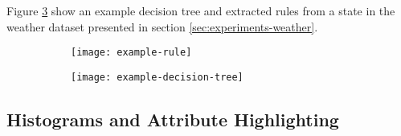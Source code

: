 Figure \ref{fig:example-decision-tree-and-rule} show an example decision tree and extracted rules
from a state in the weather dataset presented in section \ref{sec:experiments-weather}.

\begin{figure}[h!]
	\centering
	\begin{subfigure}{.3\columnwidth}
	  	\centering
	  	\texttt{[image: example-rule]}
  		\caption{}
  		\label{fig:example-rule}
	\end{subfigure}
	\begin{subfigure}{.68\columnwidth}
	  	\centering
	  	\texttt{[image: example-decision-tree]}
	  	\caption{}
	  	\label{fig:example-decision-tree}
	\end{subfigure}
	\label{fig:example-decision-tree-and-rule}
\end{figure}

\subsection{Histograms and Attribute Highlighting}

\iffalse
\subsection{Visual Assistance}

When a state becomes selected, the user interface presents the user with several visual aids which
assist them in identifying the states' meaning. The first of these aids is the timeline histogram
which shows the distribution of the states occurrence over time. An example is shown in Figure 
\ref{fig:time-hist}.

\begin{figure}[h!]
	\centering
	\texttt{[image: timeline]}
	\caption{[TODO example decision tree].}
	\label{fig:time-hist}
\end{figure}

[TODO histograms]
\fi

